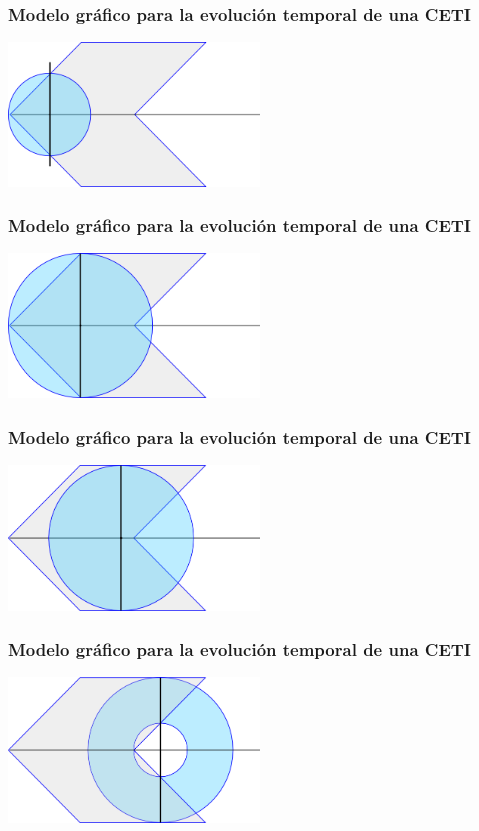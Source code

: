 \documentclass[handout]{beamer}
\theoremstyle{plain}
\theoremstyle{definition}
\theoremstyle{remark}
\begin{document}
\begin{frame}\frametitle{Modelo gráfico para la evolución temporal de
   una CETI}
\centering
\includegraphics[width=0.5\textwidth]{g5090.png}
\end{frame}

\begin{frame}\frametitle{Modelo gráfico para la evolución temporal de
   una CETI}
\centering
\includegraphics[width=0.5\textwidth]{g5098.png}
\end{frame}

\begin{frame}\frametitle{Modelo gráfico para la evolución temporal de
   una CETI}
\centering
\includegraphics[width=0.5\textwidth]{g5106.png}
\end{frame}

\begin{frame}\frametitle{Modelo gráfico para la evolución temporal de
   una CETI}
\centering
\includegraphics[width=0.5\textwidth]{g5114.png}
\end{frame}
\end{document}

